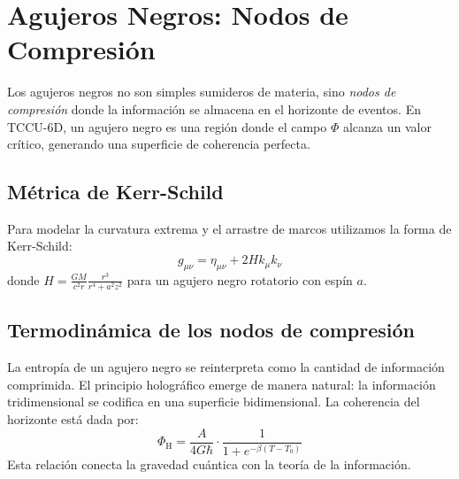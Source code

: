 \chapter{Agujeros Negros: Nodos de Compresión}
Los agujeros negros no son simples sumideros de materia, sino \emph{nodos de compresión} donde la información se almacena en el horizonte de eventos. En TCCU-6D, un agujero negro es una región donde el campo $\Phi$ alcanza un valor crítico, generando una superficie de coherencia perfecta.

\section{Métrica de Kerr-Schild}
Para modelar la curvatura extrema y el arrastre de marcos utilizamos la forma de Kerr-Schild:
\begin{equation}
g_{\mu\nu} = \eta_{\mu\nu} + 2H k_{\mu} k_{\nu}
\end{equation}
donde $H = \frac{GM}{c^2 r} \frac{r^3}{r^4 + a^2 z^2}$ para un agujero negro rotatorio con espín $a$.

\section{Termodinámica de los nodos de compresión}
La entropía de un agujero negro se reinterpreta como la cantidad de información comprimida. El principio holográfico emerge de manera natural: la información tridimensional se codifica en una superficie bidimensional. La coherencia del horizonte está dada por:
\begin{equation}
\Phi_{\text{H}} = \frac{A}{4G\hbar} \cdot \frac{1}{1 + e^{-\beta (T - T_0)}}
\end{equation}
Esta relación conecta la gravedad cuántica con la teoría de la información.
